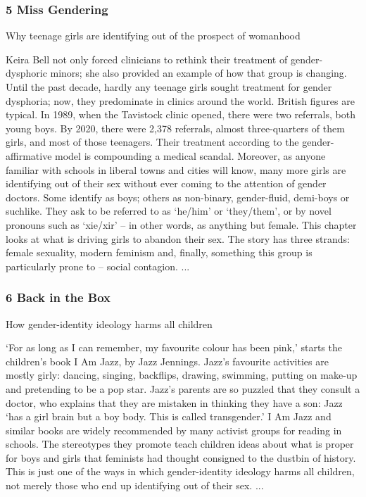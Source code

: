 \documentclass[10pt,titlepage]{book}
\begin{document}
\subsubsection{5 Miss Gendering}

Why teenage girls are identifying out of the prospect of womanhood

Keira Bell not only forced clinicians to rethink their treatment of gender-dysphoric minors; she also provided an example of how that group is changing. Until the past decade, hardly any teenage girls sought treatment for gender dysphoria; now, they predominate in clinics around the world. British figures are typical. In 1989, when the Tavistock clinic opened, there were two referrals, both young boys. By 2020, there were 2,378 referrals, almost three-quarters of them girls, and most of those teenagers. Their treatment according to the gender-affirmative model is compounding a medical scandal. Moreover, as anyone familiar with schools in liberal towns and cities will know, many more girls are identifying out of their sex without ever coming to the attention of gender doctors. Some identify as boys; others as non-binary, gender-fluid, demi-boys or suchlike. They ask to be referred to as ‘he/him’ or ‘they/them’, or by novel pronouns such as ‘xie/xir’ – in other words, as anything but female. This chapter looks at what is driving girls to abandon their sex. The story has three strands: female sexuality, modern feminism and, finally, something this group is particularly prone to – social contagion.
...

\subsubsection{6 Back in the Box}

How gender-identity ideology harms all children

‘For as long as I can remember, my favourite colour has been pink,’ starts the children’s book I Am Jazz, by Jazz Jennings. Jazz’s favourite activities are mostly girly: dancing, singing, backflips, drawing, swimming, putting on make-up and pretending to be a pop star. Jazz’s parents are so puzzled that they consult a doctor, who explains that they are mistaken in thinking they have a son: Jazz ‘has a girl brain but a boy body. This is called transgender.’ I Am Jazz and similar books are widely recommended by many activist groups for reading in schools. The stereotypes they promote teach children ideas about what is proper for boys and girls that feminists had thought consigned to the dustbin of history. This is just one of the ways in which gender-identity ideology harms all children, not merely those who end up identifying out of their sex.
...
\end{document}
